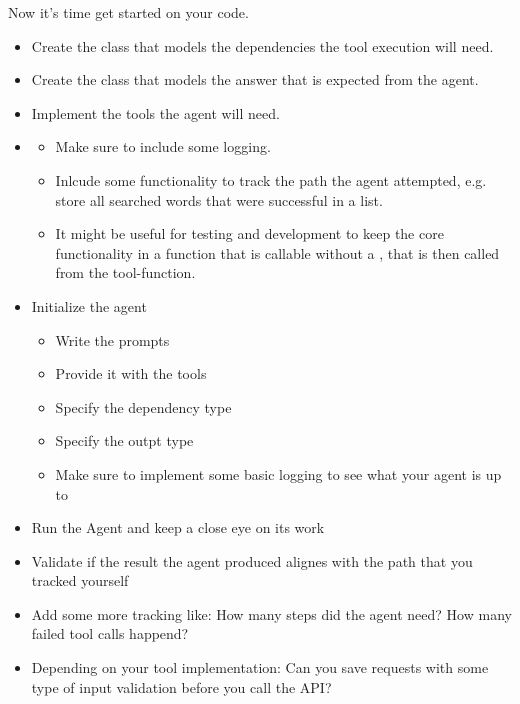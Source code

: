 \documentclass{config/minimal_uebungszettel}
\theoremstyle{definition}
\newcommand{\pp}[1]{\lpl{#1}}
\begin{document}
	
	Now it's time get started on your code.
	\begin{itemize}
		\item Create the class that models the dependencies the tool execution will need.
		
		\item Create the class that models the answer that is expected from the agent.

		
		\item Implement the tools the agent will need.
		\item[]\begin{itemize}
			\item Make sure to include some logging.
			\item Inlcude some functionality to track the path the agent attempted, e.g. store all searched words that were successful in a list.
			\item It might be useful for testing and development to keep the core functionality in a function that is callable without a \pp{RunContext}, that is then called from the tool-function.
		\end{itemize}
			
			\item Initialize the agent
			
			\begin{itemize}
				\item Write the prompts
				\item Provide it with the tools
				\item Specify the dependency type
				\item Specify the outpt type
				\item Make sure to implement some basic logging to see what your agent is up to
			\end{itemize}
			

			
			\item Run the Agent and keep a close eye on its work
			
			\item Validate if the result the agent produced alignes with the path that you tracked yourself
			
			\item Add some more tracking like: How many steps did the agent need? How many failed tool calls happend?
			
			\item Depending on your tool implementation: Can you save requests with some type of input validation before you call the API?
		\end{itemize}
		
\end{document}
